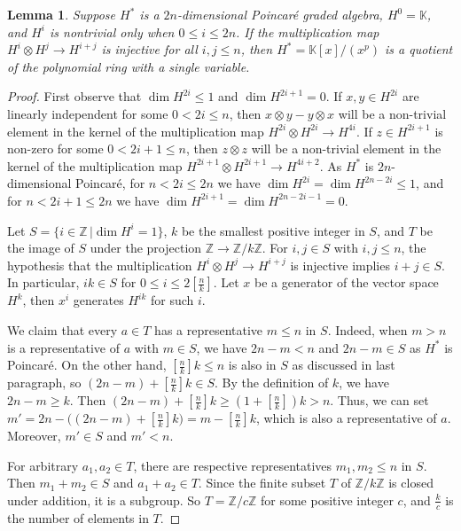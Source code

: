 \documentclass{article}
\theoremstyle{plain}
\newtheorem{lem}[thm]{Lemma}
\theoremstyle{definition}
\theoremstyle{plain}
\numberwithin{equation}{section}
\begin{document}
\begin{lem}
Suppose $H^*$ is a $2n$-dimensional Poincar\'e graded algebra, $H^0=\mathbb{K}$, and $H^i$ is nontrivial only when $0\leq i\leq 2n$. If the multiplication map $H^i\otimes H^j\to H^{i+j}$ is injective for all $i,j\leq n$, then $H^*=\mathbb{K}[x]/(x^p)$ is a quotient of the polynomial ring with a single variable.
\end{lem}
\begin{proof}
First observe that $\dim H^{2i}\leq 1$ and $\dim H^{2i+1}=0$. If $x,y\in H^{2i}$ are linearly independent for some $0<2i\leq n$, then $x\otimes y-y\otimes x$ will be a non-trivial element in the kernel of the multiplication map $H^{2i}\otimes H^{2i}\to H^{4i}$. If $z\in H^{2i+1}$ is non-zero for some $0<2i+1\leq n$, then $z\otimes z$ will be a non-trivial element in the kernel of the multiplication map $H^{2i+1}\otimes H^{2i+1}\to H^{4i+2}$. As $H^*$ is $2n$-dimensional Poincar\'e, for $n<2i\leq 2n$ we have $\dim H^{2i}=\dim H^{2n-2i}\leq 1$, and for $n<2i+1\leq 2n$ we have $\dim H^{2i+1}=\dim H^{2n-2i-1}=0$. 

Let $S=\{ i\in\mathbb{Z} \,| \dim H^i=1 \}$, $k$ be the smallest positive integer in $S$, and $T$ be the image of $S$ under the projection $\mathbb{Z}\to\mathbb{Z}/k\mathbb{Z}$. For $i,j\in S$ with $i,j\leq n$, the hypothesis that the multiplication $H^i\otimes H^j\to H^{i+j}$ is injective implies $i+j\in S$. In particular, $ik\in S$ for $0\leq i\leq 2[\frac{n}{k}]$. Let $x$ be a generator of the vector space $H^k$, then $x^i$ generates $H^{ik}$ for such $i$.

We claim that every $a\in T$ has a representative $m\leq n$ in $S$. Indeed, when $m>n$ is a representative of $a$ with $m\in S$, we have $2n-m<n$ and $2n-m\in S$ as $H^*$ is Poincar\'e. On the other hand, $[\frac{n}{k}]k\leq n$ is also in $S$ as discussed in last paragraph, so $(2n-m)+[\frac{n}{k}]k \in S$. By the definition of $k$, we have $2n-m\geq k$. Then $(2n-m)+[\frac{n}{k}]k \geq (1+[\frac{n}{k}])k>n$. Thus, we can set $m'=2n-\big( (2n-m)+[\frac{n}{k}]k \big)=m-[\frac{n}{k}]k$, which is also a representative of $a$. Moreover, $m'\in S$ and $m'<n$.

For arbitrary $a_1,a_2\in T$, there are respective representatives $m_1,m_2\leq n$ in $S$. Then $m_1+m_2\in S$ and $a_1+a_2\in T$. Since the finite subset $T$ of $\mathbb{Z}/k\mathbb{Z}$ is closed under addition, it is a subgroup. So $T=\mathbb{Z}/c\mathbb{Z}$ for some positive integer $c$, and $\frac{k}{c}$ is the number of elements in $T$.


\end{proof}
\end{document}
